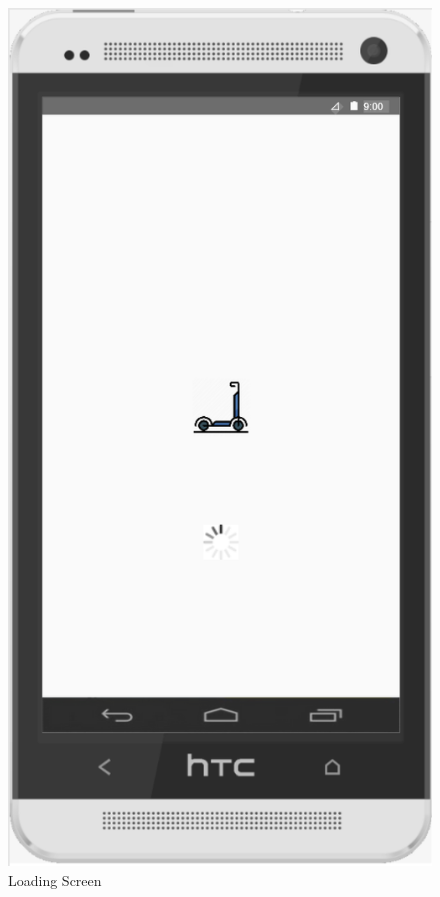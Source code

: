 \documentclass[a4paper, 12pt]{article}
\begin{document}
\begin{figure} [htbp]
  \begin{center}
    \includegraphics[scale=0.65]{images/prototypes/06-loading-screen.png}
  \end{center}
  \caption{Loading Screen}
\end{figure}
\newpage
\end{document}
